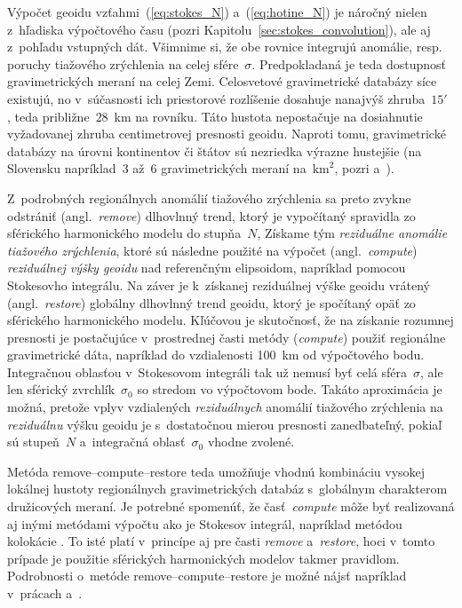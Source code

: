\documentclass[a4paper, 12pt]{book}
\begin{document}
Výpočet geoidu vzťahmi~(\ref{eq:stokes_N}) a~(\ref{eq:hotine_N}) je náročný 
nielen z~hľadiska výpočtového času (pozri 
Kapitolu~\ref{sec:stokes_convolution}), ale aj z~pohľadu vstupných dát.  
Všimnime si, že obe rovnice integrujú anomálie, resp. poruchy tiažového 
zrýchlenia na celej sfére~$\sigma$.  Predpokladaná je teda dostupnosť 
gravimetrických meraní na celej Zemi.  Celosvetové gravimetrické databázy síce 
existujú, no v~súčasnosti ich priestorové rozlíšenie dosahuje nanajvýš 
zhruba~$15'$ \parencite{EGM2008,Pail2018}, teda približne~$28$~km na rovníku.  
Táto hustota nepostačuje na dosiahnutie vyžadovanej zhruba centimetrovej 
presnosti geoidu.  Naproti tomu, gravimetrické databázy na úrovni kontinentov 
či štátov sú nezriedka výrazne hustejšie (na Slovensku napríklad~3 až~6 
gravimetrických meraní na~$\textrm{km}^2$, pozri \cite{Kubes2001} 
a~\cite{Zahorec2017}).

Z~podrobných regionálnych anomálií tiažového zrýchlenia sa preto zvykne 
odstrániť (angl.~\emph{remove}) dlhovlnný trend, ktorý je vypočítaný spravidla 
zo sférického harmonického modelu do stupňa~$N$, Získame tým \emph{reziduálne 
anomálie tiažového zrýchlenia}, ktoré sú následne použité na výpočet 
(angl.~\emph{compute}) \emph{reziduálnej výšky geoidu} nad referenčným 
elipsoidom, napríklad pomocou Stokesovho integrálu.  Na záver je k~získanej 
reziduálnej výške geoidu vrátený (angl.~\emph{restore}) globálny dlhovlnný 
trend geoidu, ktorý je spočítaný opäť zo sférického harmonického modelu.  
Kľúčovou je skutočnosť, že na získanie rozumnej presnosti je postačujúce 
v~prostrednej časti metódy (\emph{compute}) použiť regionálne gravimetrické 
dáta, napríklad do vzdialenosti 100~km od výpočtového bodu.  Integračnou 
oblasťou v~Stokesovom integráli tak už nemusí byť celá sféra~$\sigma$, ale len 
sférický zvrchlík~$\sigma_0$ so stredom vo výpočtovom bode.  Takáto aproximácia 
je možná, pretože vplyv vzdialených \emph{reziduálnych} anomálií tiažového 
zrýchlenia na \emph{reziduálnu} výšku geoidu je s~dostatočnou mierou presnosti 
zanedbateľný, pokiaľ sú stupeň~$N$ a~integračná oblasť~$\sigma_0$ vhodne 
zvolené.

Metóda remove--compute--restore teda umožňuje vhodnú kombináciu vysokej 
lokálnej hustoty regionálnych gravimetrických databáz s~globálnym charakterom 
družicových meraní.  Je potrebné spomenúť, že časť~\emph{compute} môže byť 
realizovaná aj inými metódami výpočtu ako je Stokesov integrál, napríklad 
metódou kolokácie \parencite{MoritzAdvancedGeodesy,MoritzPhysicalGeodesy}.  To 
isté platí v~princípe aj pre časti \emph{remove} a~\emph{restore}, hoci v~tomto 
prípade je použitie sférických harmonických modelov takmer pravidlom.  
Podrobnosti o~metóde remove--compute--restore je možné nájsť napríklad 
v~prácach \textcite{Sjoberg2005} a~\textcite{MoritzPhysicalGeodesy}.
\end{document}
